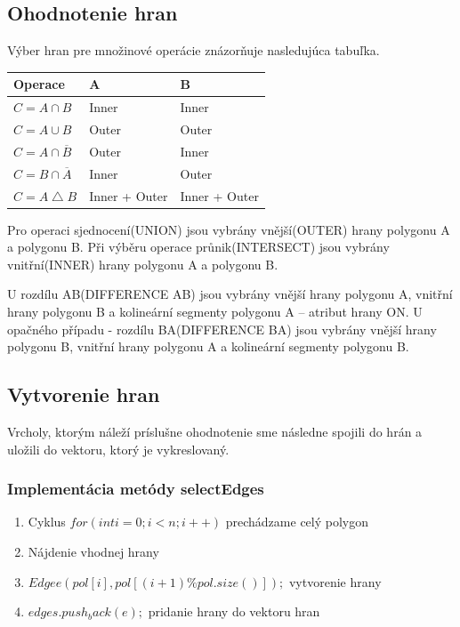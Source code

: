 \documentclass[12pt]{article}
\begin{document}
\subsection {Ohodnotenie hran}
\label{subsec:ohodnoceni}
Výber hran pre množinové operácie znázorňuje nasledujúca tabuľka.

\begin{table}[h]
	\begin{tabular}{|l|l|l|}
		\hline
		Operace & A             & B             \\ \hline \hline
		$C = A\cap B$  & Inner         & Inner         \\ \hline
		$C = A\cup B$  & Outer         & Outer         \\ \hline
		$C = A\cap \overline{B}$  & Outer         & Inner         \\ \hline
		$C = B\cap \overline{A}$  & Inner         & Outer         \\ \hline
		$C = A\bigtriangleup B$  & Inner + Outer & Inner + Outer \\ \hline
	\end{tabular}
\end{table}

Pro operaci sjednocení(UNION) jsou vybrány vnější(OUTER) hrany polygonu A a polygonu B. Při výběru operace průnik(INTERSECT) jsou vybrány vnitřní(INNER) hrany polygonu A a polygonu B.

U rozdílu AB(DIFFERENCE AB) jsou vybrány vnější hrany polygonu A, vnitřní hrany polygonu B a kolineární segmenty polygonu A -- atribut hrany ON. U opačného případu - rozdílu BA(DIFFERENCE BA) jsou vybrány vnější hrany polygonu B, vnitřní hrany polygonu A a kolineární segmenty polygonu B.

\subsection {Vytvorenie hran}
Vrcholy, ktorým náleží príslušne ohodnotenie sme následne spojili do hrán a uložili do vektoru, ktorý je vykreslovaný.

\subsubsection{Implementácia metódy selectEdges}
\begin{enumerate}
\item Cyklus $ for(int i = 0; i < n; i++)$  prechádzame celý polygon
\item Nájdenie vhodnej hrany
\item \hspace {1.0cm} $Edge e (pol[i], pol[(i+1)\%pol.size()]);$ vytvorenie hrany
\item \hspace {1.0cm} $edges.push_back(e);$ pridanie hrany do vektoru hran
\end{enumerate}
\end{document}
